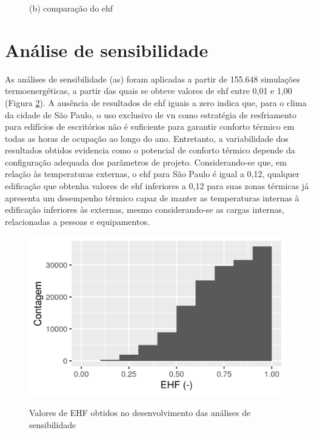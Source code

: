 \documentclass[brazil,hardcopy,openany]{ufscthesis} %
\begin{document}
\begin{figure}[h]
\begin{minipage}{.5\textwidth}
		\begin{center}
			\small{(b) comparação do \acrshort{ehf}}
		\end{center}
	\end{minipage}
	\label{fig:crack01}
\end{figure}

\newpage

\section{Análise de sensibilidade}

As análises de sensibilidade (\acrshort{as}) foram aplicadas a partir de 155.648 simulações termoenergéticas, a partir das quais se obteve valores de \acrshort{ehf} entre 0,01 e 1,00 (Figura \ref{fig:sobol_EHF}).
A ausência de resultados de \acrshort{ehf} iguais a zero indica que, para o clima da cidade de São Paulo, o uso exclusivo de \acrshort{vn} como estratégia de resfriamento para edifícios de escritórios não é suficiente para garantir conforto térmico em todas as horas de ocupação ao longo do ano. Entretanto, a variabilidade dos resultados obtidos evidencia como o potencial de conforto térmico depende da configuração adequada dos parâmetros de projeto.
Considerando-se que, em relação às temperaturas externas, o \acrshort{ehf} para São Paulo é igual a 0,12, qualquer edificação que obtenha valores de \acrshort{ehf} inferiores a 0,12 para suas zonas térmicas já apresenta um desempenho térmico capaz de manter as temperaturas internas à edificação inferiores às externas, mesmo considerando-se as cargas internas, relacionadas a pessoas e equipamentos.

\begin{figure}[h]
	\centering
	\caption{Valores de EHF obtidos no desenvolvimento das análises de sensibilidade}
	\includegraphics[width=.7\linewidth]{img/sobol_EHF.png}
	\label{fig:sobol_EHF}
\end{figure}
\end{document}
